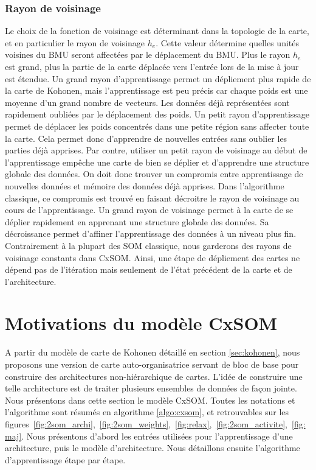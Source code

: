 \subsubsection{Rayon de voisinage}
Le choix de la fonction de voisinage est déterminant dans la topologie de la carte, et en particulier le rayon de voisinage $h_e$.
Cette valeur détermine quelles unités voisines du BMU seront affectées par le déplacement du BMU.
Plus le rayon $h_e$ est grand, plus la partie de la carte déplacée vers l'entrée lors de la mise à jour est étendue. Un grand rayon d'apprentissage permet un dépliement plus rapide de la carte de Kohonen, mais l'apprentissage est peu précis car chaque poids est une moyenne d'un grand nombre de vecteurs. Les données déjà représentées sont rapidement oubliées par le déplacement des poids.
Un petit rayon d'apprentissage permet de déplacer les poids concentrés dans une petite région sans affecter toute la carte. Cela permet donc d'apprendre de nouvelles entrées sans oublier les parties déjà apprises. Par contre, utiliser un petit rayon de voisinage au début de l'apprentissage empêche une carte de bien se déplier et d'apprendre une structure globale des données. On doit donc trouver un compromis entre apprentissage de nouvelles données et mémoire des données déjà apprises.
Dans l'algorithme classique, ce compromis est trouvé en faisant décroitre le rayon de voisinage au cours de l'apprentissage. Un grand rayon de voisinage permet à la carte de se déplier rapidement en apprenant une structure globale des données. Sa décroissance permet d'affiner l'apprentissage des données à un niveau plus fin. 
Contrairement à la plupart des SOM classique, nous garderons des rayons de voisinage constants dans CxSOM. Ainsi, une étape de dépliement des cartes ne dépend pas de l'itération mais seulement de l'état précédent de la carte et de l'architecture.

\section{Motivations du modèle CxSOM}
A partir du modèle de carte de Kohonen détaillé en section \ref{sec:kohonen}, nous proposons une version de carte auto-organisatrice servant de bloc de base pour construire des architectures non-hiérarchique de cartes. L'idée de construire une telle architecture est de traiter plusieurs ensembles de données de façon jointe.
Nous présentons dans cette section le modèle CxSOM. Toutes les notations et l'algorithme sont résumés en algorithme \ref{algo:cxsom}, et retrouvables sur les figures~\ref{fig:2som_archi},~\ref{fig:2som_weights},~\ref{fig:relax},~\ref{fig:2som_activite},~\ref{fig:maj}. Nous présentons d'abord les entrées utilisées pour l'apprentissage d'une architecture, puis le modèle d'architecture. Nous détaillons ensuite l'algorithme d'apprentissage étape par étape. 

